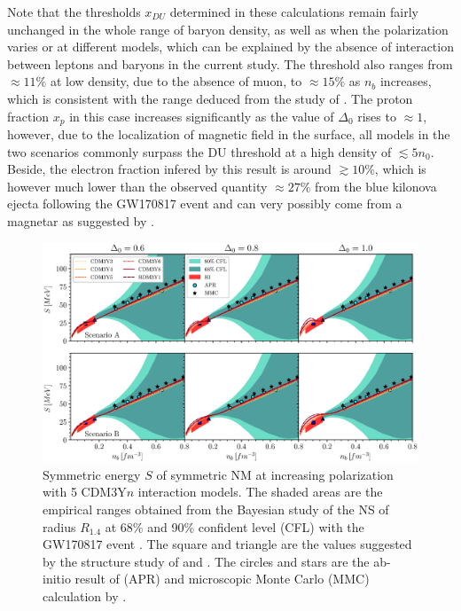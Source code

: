Note that the thresholds $x_{DU}$ determined in these calculations remain fairly unchanged in the whole range of baryon density, as well as when the polarization varies or at different models, which can be explained by the absence of interaction between leptons and baryons in the current study. The threshold also ranges from $\approx 11\%$ at low density, due to the absence of muon, to $\approx 15\%$ as $n_b$ increases, which is consistent with the range deduced from the study of \cite{lattimer1991direct}. The proton fraction $x_p$ in this case increases significantly as the value of $\Delta_0$ rises to $\approx 1$, however, due to the localization of magnetic field in the surface, all models in the two scenarios commonly surpass the \gls{DU} threshold at a high density of $\lesssim 5n_0$. Beside, the electron fraction infered by this result is around $\gtrsim 10\%$, which is however much lower than the observed quantity $\approx 27\%$ from the blue kilonova ejecta following the GW170817 event \citep{abbott2017gw170817, evans2017swift} and can very possibly come from a magnetar as suggested by \cite{metzger2018magnetar}.\par
\begin{figure}[ht!]
        \centering
        \includegraphics[width=\textwidth]{fig/S.eps}
        \caption{Symmetric energy $S$ of symmetric \gls{NM} at increasing polarization with 5 CDM3Y$n$ interaction models. The shaded areas are the empirical ranges obtained from the Bayesian study \citep{xie2019bayesian} of the \gls{NS} of radius $R_{1.4}$ at 68\% and 90\% confident level (\gls{CFL}) with the GW170817 event \citep{abbott2018gw170817}. The square and triangle are the values suggested by the structure study of \cite{trippa2008giant} and \cite{furnstahl2002neutron}. The circles and stars are the ab-initio result of \cite{akmal1998equation} (\gls{APR}) and microscopic Monte Carlo (\gls{MMC}) calculation by \cite{gandolfi2010microscopic}.}
        \label{fig:s}
\end{figure} 

